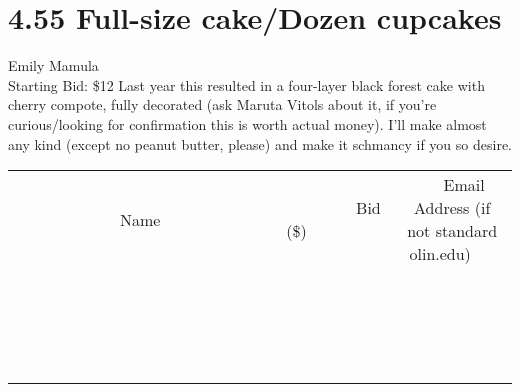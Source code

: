 \documentclass[11pt]{article}
\begin{document}
\section*{4.55 Full-size cake/Dozen cupcakes}
Emily Mamula
\\
Starting Bid: \$12
\newline
Last year this resulted in a four-layer black forest cake with cherry compote, fully decorated (ask Maruta Vitols about it, if you're curious/looking for confirmation this is worth actual money). I'll make almost any kind (except no peanut butter, please) and make it schmancy if you so desire.
\\[3ex]
\begin{tabular}{c c c}
~~~~~~~~~~~~~Name~~~~~~~~~~~~~ & ~~~~~~~~~Bid (\$)~~~~~~~~~  & ~~~Email Address (if not standard olin.edu)~~~\\
 & & \\
\hline
 & & \\
\hline
 & & \\
\hline
 & & \\
\hline
 & & \\
\hline
 & & \\
\hline
 & & \\
\hline
 & & \\
\hline
 & & \\
\hline
 & & \\
\hline
 & & \\
\hline
 & & \\
\hline
 & & \\
\hline
 & & \\
\hline
 & & \\
\hline
 & & \\
\hline
 & & \\
\hline
 & & \\
\hline
 & & \\
\hline
\end{tabular}
\newpage
\end{document}
